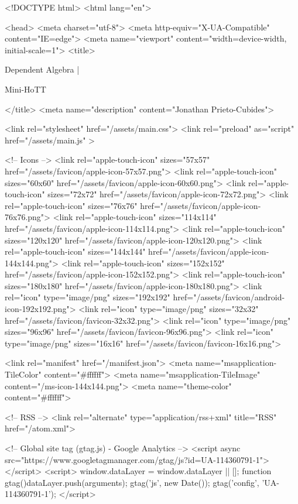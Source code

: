 <!DOCTYPE html>
<html lang="en">

<head>
  <meta charset="utf-8">
  <meta http-equiv="X-UA-Compatible" content="IE=edge">
  <meta name="viewport" content="width=device-width, initial-scale=1">
  <title>
    
      
        Dependent Algebra |
      
        Mini-HoTT
    
  </title>
  <meta name="description" content="Jonathan Prieto-Cubides">

  <link rel="stylesheet" href="/assets/main.css">
  <link rel="preload" as="script" href="/assets/main.js" >

  <!-- Icons -->
  <link rel="apple-touch-icon" sizes="57x57" href="/assets/favicon/apple-icon-57x57.png">
  <link rel="apple-touch-icon" sizes="60x60" href="/assets/favicon/apple-icon-60x60.png">
  <link rel="apple-touch-icon" sizes="72x72" href="/assets/favicon/apple-icon-72x72.png">
  <link rel="apple-touch-icon" sizes="76x76" href="/assets/favicon/apple-icon-76x76.png">
  <link rel="apple-touch-icon" sizes="114x114" href="/assets/favicon/apple-icon-114x114.png">
  <link rel="apple-touch-icon" sizes="120x120" href="/assets/favicon/apple-icon-120x120.png">
  <link rel="apple-touch-icon" sizes="144x144" href="/assets/favicon/apple-icon-144x144.png">
  <link rel="apple-touch-icon" sizes="152x152" href="/assets/favicon/apple-icon-152x152.png">
  <link rel="apple-touch-icon" sizes="180x180" href="/assets/favicon/apple-icon-180x180.png">
  <link rel="icon" type="image/png" sizes="192x192"  href="/assets/favicon/android-icon-192x192.png">
  <link rel="icon" type="image/png" sizes="32x32" href="/assets/favicon/favicon-32x32.png">
  <link rel="icon" type="image/png" sizes="96x96" href="/assets/favicon/favicon-96x96.png">
  <link rel="icon" type="image/png" sizes="16x16" href="/assets/favicon/favicon-16x16.png">

  <link rel="manifest" href="/manifest.json">
  <meta name="msapplication-TileColor" content="#ffffff">
  <meta name="msapplication-TileImage" content="/ms-icon-144x144.png">
  <meta name="theme-color" content="#ffffff">

  <!-- RSS -->
  <link rel="alternate" type="application/rss+xml" title="RSS" href="/atom.xml">

  <!-- Global site tag (gtag.js) - Google Analytics -->
  <script async src="https://www.googletagmanager.com/gtag/js?id=UA-114360791-1"></script>
  <script>
    window.dataLayer = window.dataLayer || [];
    function gtag(){dataLayer.push(arguments);}
    gtag('js', new Date());
    gtag('config', 'UA-114360791-1');
  </script>

